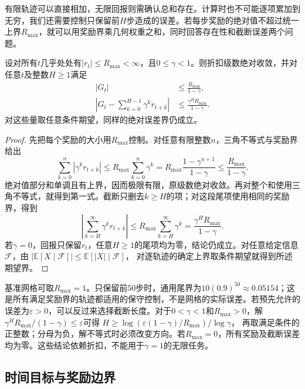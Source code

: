 有限轨迹可以直接相加，无限回报则需确认总和存在。计算时也不可能逐项累加到无穷，我们还需要控制只保留前$H$步造成的误差。若每步奖励的绝对值不超过统一上界$R_{\max}$，就可以用奖励界乘几何权重之和，同时回答存在性和截断误差两个问题。

\begin{theorem}[有界折扣回报与截断误差]
  \label{thm:rl-overview-tail}
  设对所有$t$几乎处处有$|r_t|\leq R_{\max}<\infty$，且$0\leq\gamma<1$。则折扣级数绝对收敛，并对任意$t$及整数$H\geq1$满足
  \begin{equation}
  \begin{aligned}
    |G_t|&\leq\frac{R_{\max}}{1-\gamma},\\
    \left|G_t-\sum_{k=0}^{H-1}\gamma^k r_{t+k}\right|
      &\leq\frac{\gamma^H R_{\max}}{1-\gamma}.
  \end{aligned}
  \label{eq:rl-overview-tail}
  \end{equation}
  对这些量取任意条件期望，同样的绝对误差界仍成立。
\end{theorem}

\begin{proof}
  先把每个奖励的大小用$R_{\max}$控制。对任意有限整数$n$，三角不等式与奖励界给出
  \[
    \sum_{k=0}^{n}\left|\gamma^k r_{t+k}\right|
      \leq R_{\max}\sum_{k=0}^{n}\gamma^k
      =R_{\max}\frac{1-\gamma^{n+1}}{1-\gamma}
      \leq\frac{R_{\max}}{1-\gamma}.
  \]
  绝对值部分和单调且有上界，因而极限有限，原级数绝对收敛。再对整个和使用三角不等式，就得到第一式。截断只删去$k\geq H$的项；对这段尾项使用相同的奖励界，得到
  \[
    \left|\sum_{k=H}^{\infty}\gamma^k r_{t+k}\right|
    \leq R_{\max}\sum_{k=H}^{\infty}\gamma^k
    =\frac{\gamma^H R_{\max}}{1-\gamma}.
  \]
  若$\gamma=0$，回报只保留$r_t$，任意$H\geq1$的尾项均为零，结论仍成立。对任意给定信息$\mathcal F$，由
  $|\mathbb E[X\mid\mathcal F]|\leq\mathbb E[|X|\mid\mathcal F]$，
  对逐轨迹的确定上界取条件期望就得到所述期望界。
\end{proof}

基准网格可取$R_{\max}=1$。只保留前$50$步时，通用尾界为$10(0.9)^{50}\approx0.05154$；这是所有满足奖励界的轨迹都适用的保守控制，不是网格的实际误差。若预先允许的误差为$\varepsilon>0$，可以反过来选择截断长度。对于$0<\gamma<1$和$R_{\max}>0$，解$\gamma^H R_{\max}/(1-\gamma)\leq\varepsilon$可得
$H\geq\log(\varepsilon(1-\gamma)/R_{\max})/\log\gamma$，
再取满足条件的正整数；分母为负，解不等式时必须改变方向。若$R_{\max}=0$，所有奖励及截断误差均为零。这些结论依赖折扣，不能用于$\gamma=1$的无限任务。

\subsection{时间目标与奖励边界}
\label{sec:rl-overview-reward-boundaries}

